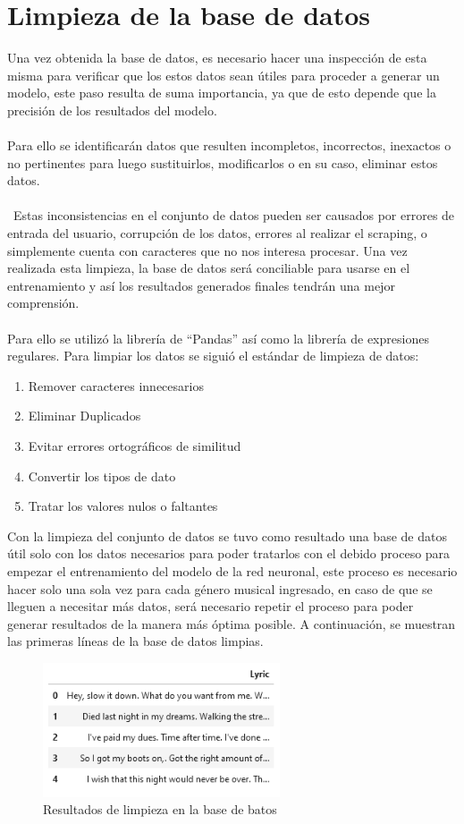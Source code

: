 \documentclass[12pt, a4paper, titlepage]{article}
\begin{document}
	\section{Limpieza de la base de datos}
	Una vez obtenida la base de datos, es necesario hacer una inspección de esta misma para verificar que los estos datos sean útiles para proceder a generar un modelo, este paso resulta de suma importancia, ya que de esto depende que la precisión de los resultados del modelo.\\\\
	Para ello se identificarán datos que resulten incompletos, incorrectos, inexactos o no pertinentes para luego sustituirlos, modificarlos o en su caso, eliminar estos datos. \\\\\
	Estas inconsistencias en el conjunto de datos pueden ser causados por errores de entrada del usuario, corrupción de los datos, errores al realizar el scraping, o simplemente cuenta con caracteres que no nos interesa procesar. Una vez realizada esta limpieza, la base de datos será conciliable para usarse en el entrenamiento y así los resultados generados finales tendrán una mejor comprensión. \\\\
	Para ello se utilizó la librería de “Pandas” así como la librería de expresiones regulares. Para limpiar los datos se siguió el estándar de limpieza de datos: \cite{data_cleaning}
	\begin{enumerate}
		\item Remover caracteres innecesarios
		\item Eliminar Duplicados
		\item Evitar errores ortográficos de similitud
		\item Convertir los tipos de dato
		\item Tratar los valores nulos o faltantes
	\end{enumerate}
	Con la limpieza del conjunto de datos se tuvo como resultado una base de datos útil solo con los datos necesarios para poder tratarlos con el debido proceso para empezar el entrenamiento del modelo de la red neuronal, este proceso es necesario hacer solo una sola vez para cada género musical ingresado, en caso de que se lleguen a necesitar más datos, será necesario repetir el proceso para poder generar resultados de la manera más óptima posible. A continuación, se muestran las primeras líneas de la base de datos limpias.
	\begin{figure}[H]
		\includegraphics[width=7cm]{./Imagenes/BasedeDatos/ResultadosLimpiezaBasedeDatos.png}
		\centering 
		\caption{Resultados de limpieza en la base de batos}
	\end{figure}
	\newpage
\end{document}
